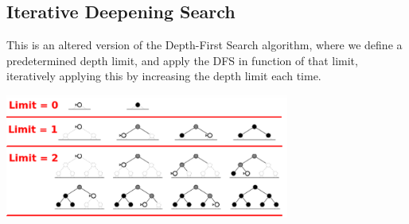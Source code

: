 \documentclass[10pt, letterpaper]{report}
\begin{document}
\subsection{Iterative Deepening Search}
This is an altered version of the Depth-First Search algorithm, where we define a predetermined depth limit, and apply the DFS in function of that limit, iteratively applying this by increasing the depth limit each time.
\begin{center}
    \includegraphics[width=0.7\textwidth ]{images/iterative_deep.png}
\end{center}
\end{document}
